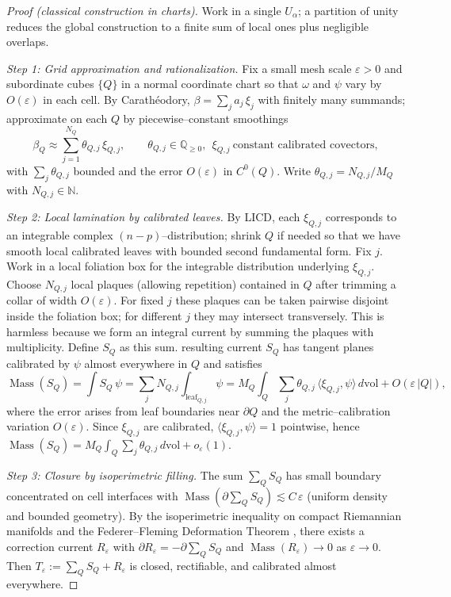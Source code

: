 \documentclass[11pt]{article}
\newcommand{\REVMZ}[1]{\textcolor{teal}{#1}}  %
\numberwithin{equation}{section}  %
\theoremstyle{plain}
\theoremstyle{definition}
\theoremstyle{remark}
\newcommand{\Q}{\mathbb{Q}}
\newcommand{\N}{\mathbb{N}}
\newcommand{\vol}{\mathrm{vol}}
\DeclareMathOperator{\Mass}{Mass}
\begin{document}
\begin{proof}[Proof (classical construction in charts)]
	Work in a single $U_\alpha$; a partition of unity reduces the global construction
	to a finite sum of local ones plus negligible overlaps.
	
	\emph{Step 1: Grid approximation and rationalization.} Fix a small mesh scale
	$\varepsilon>0$ and subordinate cubes $\{Q\}$ in a normal coordinate chart so that
	$\omega$ and $\psi$ vary by $O(\varepsilon)$ in each cell. By Carath\'eodory,
	$\beta=\sum_j a_j\,\xi_j$ with finitely many summands; approximate on each $Q$ by
	piecewise--constant smoothings
	\[
	\beta_Q \approx \sum_{j=1}^{N_Q} \theta_{Q,j}\,\xi_{Q,j},
	\qquad \theta_{Q,j}\in \Q_{\ge 0},\ \ \xi_{Q,j}\ \text{constant calibrated covectors},
	\]
	with $\sum_j \theta_{Q,j}$ bounded and the error $O(\varepsilon)$ in $C^0(Q)$.
	Write $\theta_{Q,j}=N_{Q,j}/M_Q$ with $N_{Q,j}\in\N$.
	
	\emph{Step 2: Local lamination by calibrated leaves.} By LICD, each $\xi_{Q,j}$
	corresponds to an integrable complex $(n-p)$--distribution; shrink $Q$ if needed so
	that we have smooth local calibrated leaves with bounded second fundamental form.
	Fix $j$. Work in a local foliation box for the integrable distribution underlying $\xi_{Q,j}$.
	Choose $N_{Q,j}$ local plaques (allowing repetition) contained in $Q$ after trimming a collar of width $O(\varepsilon)$.
	For fixed $j$ these plaques can be taken pairwise disjoint inside the foliation box; for different $j$ they may intersect transversely.
	This is harmless because we form an integral current by summing the plaques with multiplicity. Define $S_Q$ as this sum.
	resulting current $S_Q$ has tangent planes calibrated by $\psi$ almost everywhere
	in $Q$ and satisfies
	\[
	\Mass(S_Q) = \int S_Q\,\psi = \sum_j N_{Q,j}\int_{\mathrm{leaf}_{Q,j}}\psi
	= M_Q\int_Q \sum_j \theta_{Q,j}\,\langle \xi_{Q,j},\psi\rangle \,d\vol + O(\varepsilon\,|Q|),
	\]
	where the error arises from leaf boundaries near $\partial Q$ and the
	metric--calibration variation $O(\varepsilon)$. Since $\xi_{Q,j}$ are calibrated,
	$\langle\xi_{Q,j},\psi\rangle=1$ pointwise, hence $\Mass(S_Q)=M_Q\int_Q \sum_j
	\theta_{Q,j}\,d\vol + o_\varepsilon(1)$.
	
\emph{Step 3: Closure by isoperimetric filling.} The sum $\sum_Q S_Q$ has small
	boundary concentrated on cell interfaces with $\Mass(\partial \sum_Q S_Q)\lesssim
	C\,\varepsilon$ (uniform density and bounded geometry). By the isoperimetric
	inequality \REVMZ{\cite[Thm~6.1]{FF60}} on compact Riemannian manifolds and the Federer--Fleming Deformation
	Theorem \REVMZ{\cite[4.2.9]{Fed69}}, there exists a correction current $R_\varepsilon$ with
	$\partial R_\varepsilon = -\partial \sum_Q S_Q$ and $\Mass(R_\varepsilon)\to 0$ as
	$\varepsilon\to 0$. Then $T_\varepsilon:=\sum_Q S_Q+R_\varepsilon$ is closed,
	rectifiable, and calibrated almost everywhere.
	

\end{proof}
\end{document}
